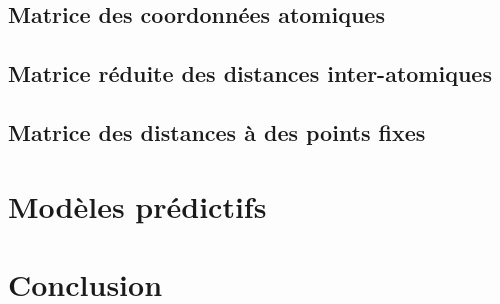 \documentclass{report}
\begin{document}
	\section{Matrice des coordonnées atomiques}
		

	\section{Matrice réduite des distances inter-atomiques}
		
		
	\section{Matrice des distances à des points fixes}
		
	\section{}

\chapter{Modèles prédictifs}

\chapter{Conclusion}
	
	

\addappheadtotoc
\appendixpage

\appendix
\end{document}
